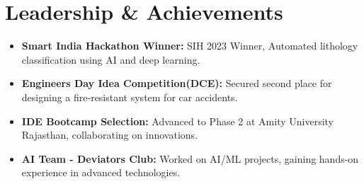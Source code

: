 \documentclass[letterpaper,11pt]{article}
\newcommand{\resumeItem}[1]{
  \item\small{
    {#1 \vspace{-2pt}}
  }
}
\newcommand{\resumeSubHeadingListStart}{\begin{itemize}[leftmargin=0.0in, label={}]}
\newcommand{\resumeSubHeadingListEnd}{\end{itemize}}
\begin{document}
\section{Leadership \& Achievements}
\resumeSubHeadingListStart
  \resumeItem{\textbf{Smart India Hackathon Winner:} SIH 2023 Winner, Automated lithology classification using AI and deep learning.}
  \resumeItem{\textbf{Engineers Day Idea Competition(DCE):} Secured second place for designing a fire-resistant system for car accidents.}
  \resumeItem{\textbf{IDE Bootcamp Selection:} Advanced to Phase 2 at Amity University Rajasthan, collaborating on innovations.}
  \resumeItem{\textbf{AI Team - Deviators Club:} Worked on AI/ML projects, gaining hands-on experience in advanced technologies.}
\resumeSubHeadingListEnd
\end{document}
